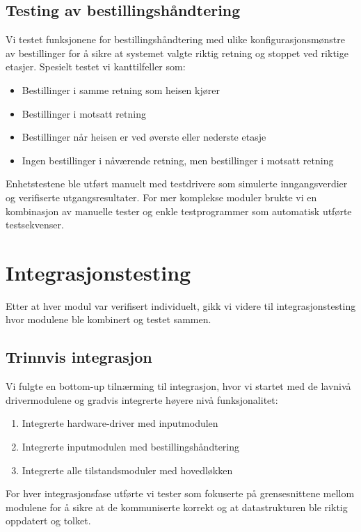 \subsection{Testing av bestillingshåndtering}
Vi testet funksjonene for bestillingshåndtering med ulike konfigurasjonsmønstre av bestillinger for å sikre at systemet valgte riktig retning og stoppet ved riktige etasjer. Spesielt testet vi kanttilfeller som:

\begin{itemize}
    \item Bestillinger i samme retning som heisen kjører
    \item Bestillinger i motsatt retning
    \item Bestillinger når heisen er ved øverste eller nederste etasje
    \item Ingen bestillinger i nåværende retning, men bestillinger i motsatt retning
\end{itemize}

Enhetstestene ble utført manuelt med testdrivere som simulerte inngangsverdier og verifiserte utgangsresultater. For mer komplekse moduler brukte vi en kombinasjon av manuelle tester og enkle testprogrammer som automatisk utførte testsekvenser.

\section{Integrasjonstesting}
Etter at hver modul var verifisert individuelt, gikk vi videre til integrasjonstesting hvor modulene ble kombinert og testet sammen.

\subsection{Trinnvis integrasjon}
Vi fulgte en bottom-up tilnærming til integrasjon, hvor vi startet med de lavnivå drivermodulene og gradvis integrerte høyere nivå funksjonalitet:

\begin{enumerate}
    \item Integrerte hardware-driver med inputmodulen
    \item Integrerte inputmodulen med bestillingshåndtering
    \item Integrerte alle tilstandsmoduler med hovedløkken
\end{enumerate}

For hver integrasjonsfase utførte vi tester som fokuserte på grensesnittene mellom modulene for å sikre at de kommuniserte korrekt og at datastrukturen ble riktig oppdatert og tolket.

